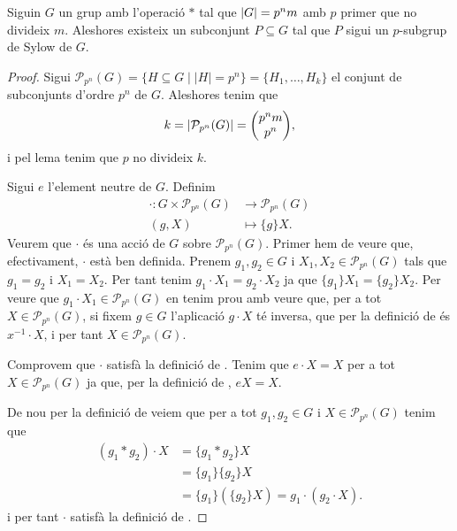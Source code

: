 \documentclass[../Apunts.tex]{subfiles}
\begin{document}
	\begin{theorem}
		\label{thm:Primer Teorema de Sylow}
		Siguin \(G\) un grup amb l'operació \(\ast\) tal que \(\abs{G}=p^{n}m\) amb \(p\) primer que no divideix \(m\). Aleshores existeix un subconjunt \(P\subseteq G\) tal que \(P\) sigui un \(p\)-subgrup de Sylow de \(G\).
		\begin{proof}%
			Sigui \(\mathcal{P}_{p^{n}}(G)=\{H\subseteq G\mid\lvert H\rvert=p^{n}\}=\{H_{1},\dots,H_{k}\}\) el conjunt de subconjunts d'ordre \(p^{n}\) de \(G\). Aleshores tenim que
			\begin{displaymath}
			k=\abs{\mathcal{P}_{p^{n}}(G)}=\left(\begin{matrix}p^{n}m\\p^{n}\end{matrix}\right),
			\end{displaymath}
			i pel lema  tenim que \(p\) no divideix \(k\). %
			
			Sigui \(e\) l'element neutre de \(G\). Definim
			\begin{align}\label{eq:thm:Primer Teorema de Sylow 1}
			\cdot\colon G\times\mathcal{P}_{p^{n}}(G)&\longrightarrow \mathcal{P}_{p^{n}}(G)\\
			(g,X)&\longmapsto\{g\}X.\nonumber
			\end{align}
			Veurem que \(\cdot\) és una acció de \(G\) sobre \(\mathcal{P}_{p^{n}}(G)\). Primer hem de veure que, efectivament, \(\cdot\) està ben definida. Prenem \(g_{1},g_{2}\in G\) i \(X_{1},X_{2}\in \mathcal{P}_{p^{n}}(G)\) tals que \(g_{1}=g_{2}\) i \(X_{1}=X_{2}\). Per tant tenim \(g_{1}\cdot X_{1}=g_{2}\cdot X_{2}\) ja que \(\{g_{1}\}X_{1}=\{g_{2}\}X_{2}\). Per veure que \(g_{1}\cdot X_{1}\in\mathcal{P}_{p^{n}}(G)\) en tenim prou amb veure que, per a tot \(X\in\mathcal{P}_{p^{n}}(G)\), si fixem \(g\in G\) l'aplicació \(g\cdot X\) té inversa, que per la definició de  és \(x^{-1}\cdot X\), i per tant \(X\in\mathcal{P}_{p^{n}}(G)\).
			
			Comprovem que \(\cdot\) satisfà la definició de . Tenim que \(e\cdot X=X\) per a tot \(X\in\mathcal{P}_{p^{n}}(G)\) ja que, per la definició de , \(eX=X\).
			
			De nou per la definició de  veiem que per a tot \(g_{1},g_{2}\in G\) i \(X\in\mathcal{P}_{p^{n}}(G)\) tenim que \begin{align*}
			(g_{1}\ast g_{2})\cdot X&=\{g_{1}\ast g_{2}\}X\\
			&=\{g_{1}\}\{g_{2}\}X\\
			&=\{g_{1}\}(\{g_{2}\}X)=g_{1}\cdot(g_{2}\cdot X).
			\end{align*}
			i per tant \(\cdot\) satisfà la definició de .
			

\end{proof}
\end{theorem}
\end{document}
